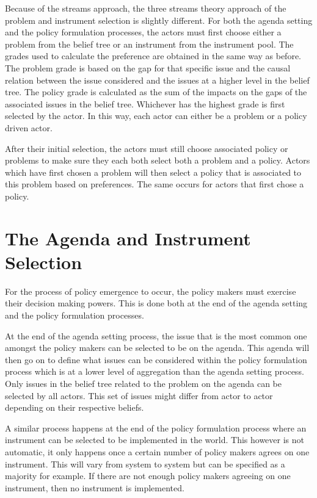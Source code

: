 Because of the streams approach, the three streams theory approach of the problem and instrument selection is slightly different. For both the agenda setting and the policy formulation processes, the actors must first choose either a problem from the belief tree or an instrument from the instrument pool.  The grades used to calculate the preference are obtained in the same way as before. The problem grade is based on the gap for that specific issue and the causal relation between the issue considered and the issues at a higher level in the belief tree. The policy grade is calculated as the sum of the impacts on the gaps of the associated issues in the belief tree. Whichever has the highest grade is first selected by the actor. In this way, each actor can either be a problem or a policy driven actor.

After their initial selection, the actors must still choose associated policy or problems to make sure they each both select both a problem and a policy. Actors which have first chosen a problem will then select a policy that is associated to this problem based on preferences. The same occurs for actors that first chose a policy.

%
\section{The Agenda and Instrument Selection}
\label{sec:agendaInstrumentSelection}

For the process of policy emergence to occur, the policy makers must exercise their decision making powers. This is done both at the end of the agenda setting and the policy formulation processes.

At the end of the agenda setting process, the issue that is the most common one amongst the policy makers can be selected to be on the agenda. This agenda will then go on to define what issues can be considered within the policy formulation process which is at a lower level of aggregation than the agenda setting process. Only issues in the belief tree related to the problem on the agenda can be selected by all actors. This set of issues might differ from actor to actor depending on their respective beliefs.

A similar process happens at the end of the policy formulation process where an instrument can be selected to be implemented in the world. This however is not automatic, it only happens once a certain number of policy makers agrees on one instrument. This will vary from system to system but can be specified as a majority for example. If there are not enough policy makers agreeing on one instrument, then no instrument is implemented.

